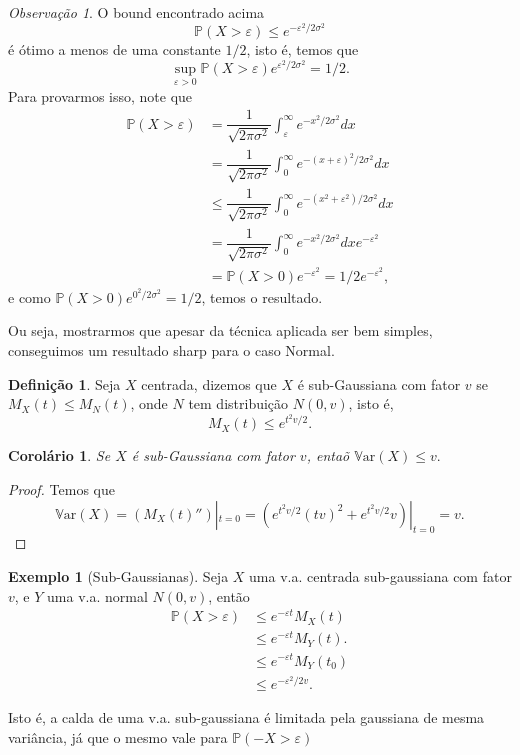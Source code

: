 \documentclass[12pt,a4paper,oneside]{book}
\newtheorem{corollary}[theorem]{Corol\'ario}
\theoremstyle{definition}
\newtheorem{definition}[theorem]{Defini\c{c}\~ao}
\newtheorem{example}[theorem]{Exemplo}
\theoremstyle{remark}
\newtheorem{remark}[theorem]{Observa\c{c}\~ao}
\numberwithin{equation}{section}
\newcommand{\e}{\varepsilon}
\newcommand{\pr}{\mathbb{P}}
\newcommand{\Var}{\mathbb{V}\text{ar}}
\begin{document}
\begin{tcolorbox}[colback = yellow!60]
\begin{remark}
O bound encontrado acima
$$ \pr(X>\e) \leq e^{ -\e^2/2\sigma^2}$$
é ótimo a menos de uma constante $1/2$, isto é, temos que
$$\sup_{\e>0} \pr(X>\e) e^{ \e^2/2\sigma^2} = 1/2.$$
Para provarmos isso, note que
\begin{align*}
\pr(X>\e) & = \dfrac{1}{\sqrt{2\pi \sigma^2}}\int_\e^\infty  e^{ -x^2/2\sigma^2}dx \\
& = \dfrac{1}{\sqrt{2\pi \sigma^2}}\int^\infty_0  e^{ -(x+\e)^2/2\sigma^2}dx \\
& \leq \dfrac{1}{\sqrt{2\pi \sigma^2}}\int^\infty_0  e^{ -(x^2+\e^2)/2\sigma^2}dx \\
& = \dfrac{1}{\sqrt{2\pi \sigma^2}}\int^\infty_0  e^{ -x^2/2\sigma^2}dx e^{-\e^2} \\
& = \pr(X>0)e^{-\e^2} = 1/2 e^{-\e^2},
\end{align*}
e como $\pr(X>0) e^{ 0^2/2\sigma^2} = 1/2$, temos o resultado.

Ou seja, mostrarmos que apesar da técnica aplicada ser bem simples, conseguimos um resultado sharp para o caso Normal.
\end{remark}
\end{tcolorbox}

\begin{definition}
Seja $X$ centrada, dizemos que $X$ é sub-Gaussiana com fator $v$ se $M_X(t)\leq M_N(t)$, onde $N$ tem distribuição $N(0,v)$, isto é,
$$M_X(t)\leq e^{t^2v/2}. $$
\end{definition}

\begin{corollary}
Se $X$ é sub-Gaussiana com fator $v$, entaõ $\Var(X)\leq v.$
\end{corollary}
\begin{proof}
Temos que 
$$\Var(X) = (M_X(t)'')|_{t=0}  = (e^{t^2v/2}(tv)^2 + e^{t^2v/2}v)|_{t=0} = v.$$
\end{proof}



\begin{example}[Sub-Gaussianas]
Seja $X$ uma v.a. centrada sub-gaussiana com fator $v$, e $Y$ uma v.a. normal $N(0,v)$, então
\begin{align*}
\pr(X>\e) & \leq  e^{-\e t}M_X(t)\\
	&\leq e^{-\e t}M_Y(t).\\
	&\leq e^{-\e t}M_Y(t_0)\\
	&\leq e^{-\e^2/2v}.
\end{align*}

\begin{tcolorbox}[colback = yellow!60]
Isto é, a calda de uma v.a. sub-gaussiana é limitada pela gaussiana de mesma variância, já que o mesmo vale para $ \pr(-X>\e)$ 
\end{tcolorbox}

\end{example}
\end{document}
